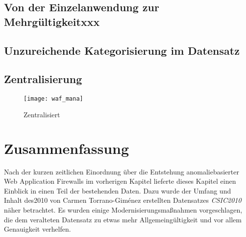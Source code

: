 
\subsection{Von der Einzelanwendung zur Mehrgültigkeitxxx}



\subsection{Unzureichende Kategorisierung im Datensatz}



\subsection{Zentralisierung}

\begin{figure}[ht]
  \begin{center}
    \texttt{[image: waf\_mana]}
    \caption{Zentralisiert~\cite{Manaseer2018}}
    \label{fig.topten}
  \end{center}
\end{figure}



\section{Zusammenfassung}

Nach der kurzen zeitlichen Einordnung über die Entstehung anomaliebasierter Web Application Firewalls im vorherigen Kapitel lieferte dieses Kapitel einen Einblick in einen Teil der bestehenden Daten. Dazu wurde der Umfang und Inhalt des2010 von Carmen Torrano-Giménez erstellten Datensatzes \emph{CSIC2010} näher betrachtet. Es wurden einige Modernisierungsmaßnahmen vorgeschlagen, die dem veralteten Datensatz zu etwas mehr Allgemeingültigkeit und vor allem Genauigkeit verhelfen.


